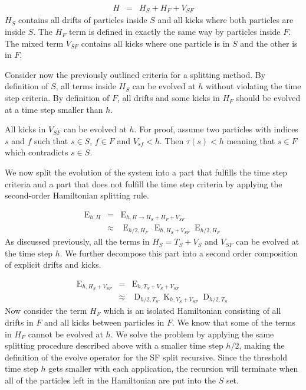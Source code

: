 \documentclass[referee]{aa}
\begin{document}
\begin{eqnarray}
H & = & H_{S}+H_{F}+V_{SF}\label{eq:SF-splitting-rule}
\end{eqnarray}
$H_{S}$ contains all drifts of particles inside $S$ and all kicks
where both particles are inside $S$. The $H_{F}$ term is defined
in exactly the same way by particles inside $F$. The mixed term $V_{SF}$
contains all kicks where one particle is in $S$ and the other is
in $F$.

Consider now the previously outlined criteria for a splitting method.
By definition of $S$, all terms inside $H_{S}$ can be evolved at
$h$ without violating the time step criteria. By definition of $F$,
all drifts and some kicks in $H_{F}$ should be evolved at a time
step smaller than $h$.

All kicks in $V_{SF}$ can be evolved at $h$. For proof, assume two
particles with indices $s$ and $f$ such that $s\in S$, $f\in F$
and $V_{sf}<h$. Then $\tau(s)<h$ meaning that $s\in F$ which contradicts
$s\in S$.

We now split the evolution of the system into a part that fulfills
the time step criteria and a part that does not fulfill the time step
criteria by applying the second-order Hamiltonian splitting rule.

\begin{eqnarray}
\operatorname{E}_{h,H} & = & \operatorname{E}_{h,H\rightarrow H_{S}+H_{F}+V_{SF}}\\
 & \approx & \operatorname{E}_{h/2,H_{F}}\,\operatorname{E}_{h,H_{S}+V_{SF}}\operatorname{E}_{h/2,H_{F}}
\end{eqnarray}
As discussed previously, all the terms in $H_{S}=T_{S}+V_{S}$ and
$V_{SF}$ can be evolved at the time step $h$. We further decompose
this part into a second order composition of explicit drifts and kicks.

\begin{eqnarray}
\operatorname{E}_{h,H_{S}+V_{SF}} & = & \operatorname{E}_{h,T_{S}+V_{S}+V_{SF}}\\
 & \approx & \operatorname{D}_{h/2,T_{S}}\operatorname{K}_{h,V_{S}+V_{SF}}\operatorname{D}_{h/2,T_{S}}
\end{eqnarray}
Now consider the term $H_{F}$ which is an isolated Hamiltonian consisting
of all drifts in $F$ and all kicks between particles in $F$. We
know that some of the terms in $H_{F}$ cannot be evolved at $h$.
We solve the problem by applying the same splitting procedure described
above with a smaller time step $h/2$, making the definition of the
evolve operator for the SF split recursive. Since the threshold time
step $h$ gets smaller with each application, the recursion will terminate
when all of the particles left in the Hamiltonian are put into the
$S$ set.
\end{document}
